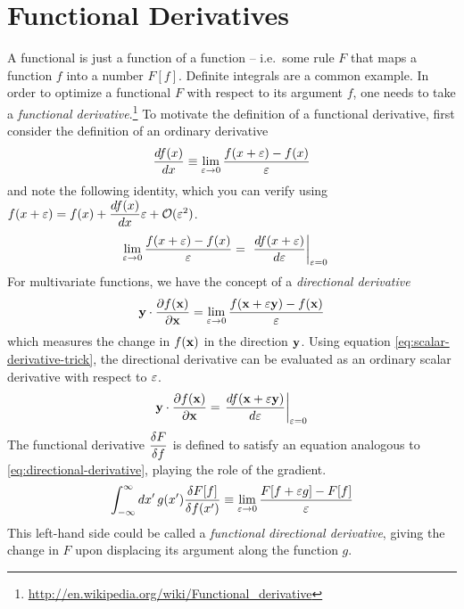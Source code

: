 \documentclass[11pt]{article}
\numberwithin{equation}{section}
\begin{document}
\newpage
\section{Functional Derivatives}\label{app:functional-derivatives}

A functional is just a function of a function -- i.e.\ some rule $F$ that maps a function $f$ into a number $F[f]$.  Definite integrals are a common example.
In order to optimize a functional $F$ with respect to its argument $f$, one needs to take a \textit{functional derivative}.\footnote{\url{http://en.wikipedia.org/wiki/Functional_derivative}}
To motivate the definition of a functional derivative, first consider the definition of an ordinary derivative
\begin{align}
  \frac {d f(x)}{d x}
\equiv
  \lim_{\varepsilon\rightarrow0}
  \frac {f(x+\varepsilon)-f(x)}{\varepsilon}
\end{align}
and note the following identity, which you can verify using
$
  f(x+\varepsilon)
=
  f(x)
+
  \dfrac{d f(x)}{d x}
  \varepsilon
+
  \mathcal{O}(\varepsilon^2)
$.
\begin{align}\label{eq:scalar-derivative-trick}
  \lim_{\varepsilon\rightarrow0}
  \frac {f(x+\varepsilon)-f(x)}{\varepsilon}
=&\
\left.
  \frac {df(x+\varepsilon)}{d\varepsilon}
\right|_{\varepsilon=0}
\end{align}
For multivariate functions, we have the concept of a \textit{directional derivative}
\begin{align}\label{eq:directional-derivative}
  \mathbf{y}\cdot
  \frac {\partial f(\mathbf{x})}{\partial\mathbf{x}}
=
  \lim_{\varepsilon\rightarrow0}
  \frac {f(\mathbf{x}+\varepsilon\mathbf{y}) - f(\mathbf{x})}{\varepsilon}
\end{align}
which measures the change in $f(\mathbf{x})$ in the direction $\mathbf{y}$.
Using equation \ref{eq:scalar-derivative-trick}, the directional derivative can be evaluated as an ordinary scalar derivative with respect to $\varepsilon$.
\begin{align}\label{eq:vector-derivative-trick}
  \mathbf{y}\cdot
  \frac {\partial f(\mathbf{x})}{\partial\mathbf{x}}
=
  \left.
  \frac {d f(\mathbf{x} + \varepsilon\mathbf{y})}{d \varepsilon}
  \right|_{\varepsilon=0}
\end{align}
The functional derivative $\dfrac{\delta  F}{\delta  f}$ is defined to satisfy an equation analogous to \ref{eq:directional-derivative}, playing the role of the gradient.
\begin{align}
  \int_{-\infty}^{\infty}
  dx'\,
  g(x')
  \frac {\delta  F[f]}{\delta  f(x')}
\equiv
  \lim_{\varepsilon\rightarrow0}
  \frac {F[f+\varepsilon g] - F[f]}{\varepsilon}
\end{align}
This left-hand side could be called a \textit{functional directional derivative}, giving the change in $F$ upon displacing its argument along the function $g$.
\end{document}

